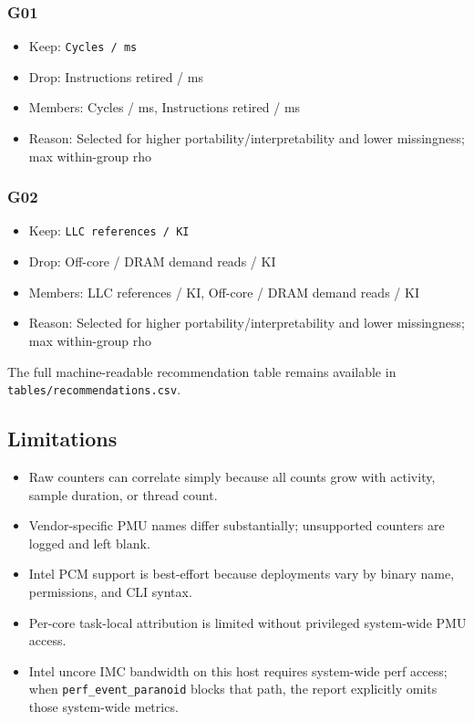 \documentclass[
]{article}
\providecommand{\tightlist}{%
  \setlength{\itemsep}{0pt}\setlength{\parskip}{0pt}}
\begin{document}
\hypertarget{g01}{%
\subsubsection{G01}\label{g01}}

\begin{itemize}
\tightlist
\item
  Keep: \texttt{Cycles\ /\ ms}
\item
  Drop: Instructions retired / ms
\item
  Members: Cycles / ms, Instructions retired / ms
\item
  Reason: Selected for higher portability/interpretability and lower
  missingness; max within-group \textbar rho
\end{itemize}

\hypertarget{g02}{%
\subsubsection{G02}\label{g02}}

\begin{itemize}
\tightlist
\item
  Keep: \texttt{LLC\ references\ /\ KI}
\item
  Drop: Off-core / DRAM demand reads / KI
\item
  Members: LLC references / KI, Off-core / DRAM demand reads / KI
\item
  Reason: Selected for higher portability/interpretability and lower
  missingness; max within-group \textbar rho
\end{itemize}

The full machine-readable recommendation table remains available in
\texttt{tables/recommendations.csv}.

\hypertarget{limitations}{%
\subsection{Limitations}\label{limitations}}

\begin{itemize}
\tightlist
\item
  Raw counters can correlate simply because all counts grow with
  activity, sample duration, or thread count.
\item
  Vendor-specific PMU names differ substantially; unsupported counters
  are logged and left blank.
\item
  Intel PCM support is best-effort because deployments vary by binary
  name, permissions, and CLI syntax.
\item
  Per-core task-local attribution is limited without privileged
  system-wide PMU access.
\item
  Intel uncore IMC bandwidth on this host requires system-wide perf
  access; when \texttt{perf\_event\_paranoid} blocks that path, the
  report explicitly omits those system-wide metrics.
\end{itemize}
\end{document}
